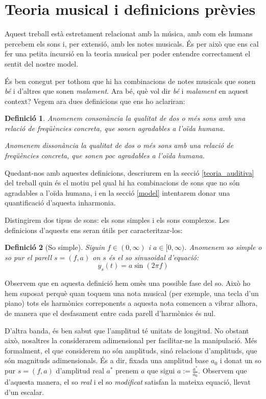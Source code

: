 \documentclass{article}
\theoremstyle{math}
\newtheorem{definition}{Definició}[section]
\theoremstyle{TheoremNum}
\newcommand{\0}{\ensuremath{\vb{0}}}
\begin{document}
\section{Teoria musical i definicions prèvies}\label{teoria_musical}
Aquest treball està estretament relacionat amb la música, amb com els humans percebem els sons i, per extensió, amb les notes musicals. És per això que ens cal fer una petita incursió en la teoria musical per poder entendre correctament el sentit del nostre model.\par
És ben conegut per tothom que hi ha combinacions de notes musicals que sonen \textit{bé} i d'altres que sonen \textit{malament}. Ara bé, què vol dir \textit{bé} i \textit{malament} en aquest context? Vegem ara dues definicions que ens ho aclariran:
\begin{definition}
  Anomenem \textit{consonància} la qualitat de dos o més sons amb una relació de freqüències concreta, que sonen agradables a l'oïda humana.\par
  \noindent Anomenem \textit{dissonància} la qualitat de dos o més sons amb una relació de freqüències concreta, que sonen poc agradables a l'oïda humana.
\end{definition}
Quedant-nos amb aquestes definicions, descriurem en la secció \ref{teoria_auditiva} del treball quin és el motiu pel qual hi ha combinacions de sons que no són agradables a l'oïda humana, i en la secció \ref{model} intentarem donar una quantificació d'aquesta inharmonia.\par
Distingirem dos tipus de sons: els sons simples i els sons complexos. Les definicions d'aquests ens seran útils per caracteritzar-los:
\begin{definition}[So simple]
  Siguin $f\in(0,\infty)$ i $a\in[0,\infty)$. Anomenem \textit{so simple} o \textit{so pur} el parell $s=(f, a)$ on $s$ és el so sinusoidal d'equació: $$y_s(t)=a\sin(2\pi f)$$
\end{definition}
\noindent Observem que en aquesta definició hem omès una possible fase del so. Això ho hem suposat perquè quan toquem una nota musical (per exemple, una tecla d'un piano) tots els harmònics correponents a aquesta nota comencen a vibrar alhora, de manera que el desfasament entre cada parell d'harmònics és nul.\par D'altra banda, és ben sabut que l'amplitud té unitats de longitud. No obstant això, nosaltres la considerarem adimensional per facilitar-ne la manipulació. Més formalment, el que considerem no són amplituds, sinó relacions d'amplituds, que són magnituds adimensionals. És a dir, fixada una amplitud base $a_0$ i donat un so pur $s=(f,a)$ d'amplitud real $a^*$ prenem $a$ que sigui $a:=\frac{a^*}{a_0}$. Observem que d'aquesta manera, el so \textit{real} i el so \textit{modificat} satisfan la mateixa equació, llevat d'un escalar.
\end{document}

